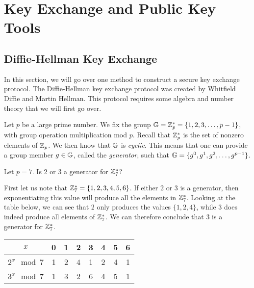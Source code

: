 \section{Key Exchange and Public Key Tools}
\label{sec:pke2}


\subsection{Diffie-Hellman Key Exchange}

In this section, we will go over one method to construct a secure key exchange protocol. The Diffie-Hellman key exchange protocol was created by Whitfield Diffie and Martin Hellman. This protocol requires some algebra and number theory that we will first go over. 

Let $p$ be a large prime number. We fix the group $\mathbb{G} = {{\mathbb Z}}_p^*=\{1,2,3,\ldots,p-1\}$, with group operation multiplication mod $p$. Recall that ${{\mathbb Z}}_p^*$ is the set of nonzero elements of ${{\mathbb Z}}_p$. We then know that $\mathbb{G}$ is \textit{cyclic}. This means that one can provide a group member $g \in \mathbb{G}$, called the \textit{generator}, such that $\mathbb{G} = \{g^0, g^1, g^2, \ldots, g^{p-1}\}$. 

\begin{example}
	Let $p=7$. Is 2 or 3 a generator for ${{\mathbb Z}}_7^*$?
	
	First let us note that ${{\mathbb Z}}_7^* = \{1,2,3,4,5,6\}$. If either 2 or 3 is a generator, then exponentiating this value will produce all the elements in ${{\mathbb Z}}_7^*$. Looking at the table below, we can see that 2 only produces the values $\{1,2,4\}$, while 3 does indeed produce all elements of ${{\mathbb Z}}_7^*$. We can therefore conclude that 3 is a generator for ${{\mathbb Z}}_7^*$. 
	\begin{center}
	\begin{tabular}{|c|c|c|c|c|c|c|c|}
		\hline
		$x$ & 0 & 1 & 2 & 3 & 4 & 5 & 6 \\
		\hline \hline
		$2^x \mod 7$ & 1 & 2 & 4 & 1 & 2 & 4 & 1 \\
		\hline
		$3^x \mod 7$ & 1 & 3 & 2 & 6 & 4 & 5 & 1 \\
		\hline
	\end{tabular}
	\end{center}
\end{example}

